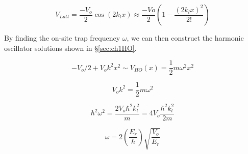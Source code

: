 \begin{equation}
V_{Latt} = \frac{-V_o}{2} \cos{\left ( 2 k_l x \right ) } \approx \frac{-Vo}{2}  \left ( 1 - \frac{ \left ( 2 k_l x \right )^2 }{2!} \right )
\end{equation}

By finding the on-site trap frequency $\omega$, we can then construct the harmonic oscillator solutions shown in \S \ref{sec:ch1HO}.

\[
-V_o/2 + V_o k^2 x^2 \sim V_{HO}(x) = \frac{1}{2} m \omega^2 x^2
\]

\[
V_o k^2 = \frac{1}{2} m \omega^2
\]

\[
\hbar^2 \omega^2 = \frac{2 V_o \hbar^2 k_l^2}{m} = 4 V_o \frac{\hbar^2 k_l^2}{2 m} 
 \]
 
 \[
 \omega = 2 \left ( \frac{E_r}{\hbar} \right ) \sqrt{\frac{V_o}{E_r}} 
 \]
%
%

%


